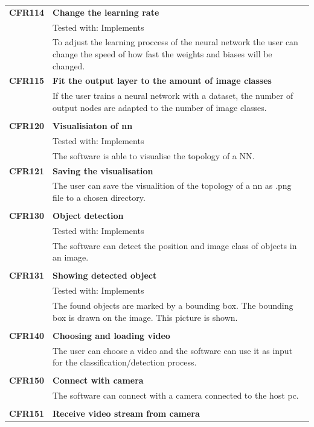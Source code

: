 \documentclass[parskip=full]{scrartcl}
\begin{document}
\begin{tabular}{p{2cm}p{12cm}}
\textbf {CFR114} & \textbf{Change the learning rate} \\
& Tested with: Implements\\
& To adjust the learning proccess of the neural network the user can change the speed of how fast the weights and biases will be changed.\\
\textbf{CFR115} & \textbf{Fit the output layer to the amount of image classes}\\
& If the user trains a neural network with a dataset, the number of output nodes are adapted to the number of image classes.\\
& \\
\textbf {CFR120} & \textbf{Visualisiaton of \gls{nn}} \\
& Tested with: Implements\\
& The software is able to visualise the topology of a NN.\\
\textbf{CFR121} & \textbf{Saving the visualisation}\\
& The user can save the visualition of the topology of a \gls{nn} as .png file to a chosen directory.\\
& \\
\textbf {CFR130} & \textbf{Object detection} \\
& Tested with: Implements\\
& The software can detect the position and image class of objects in an image.\\
& \\
\textbf {CFR131} & \textbf{Showing detected object} \\
& Tested with: Implements\\
& The found objects are marked by a bounding box. The bounding box is drawn on the image. This picture is shown.\\
& \\
\textbf{CFR140} & \textbf{Choosing and loading video}\\
& The user can choose a video and the software can use it as input for the classification/detection process.\\
& \\
\textbf{CFR150} & \textbf{Connect with camera}\\
& The software can connect with a camera connected to the host pc.\\
& \\
\textbf{CFR151} & \textbf{Receive video stream from camera}\\

\end{tabular}
\end{document}
